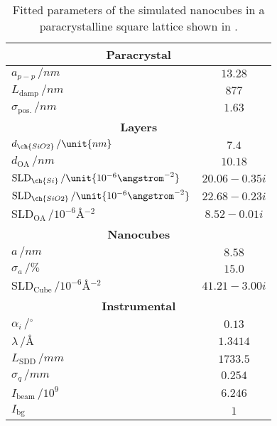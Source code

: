 \documentclass[\main/dresen_thesis.tex]{subfiles}
\begin{document}
  \begin{table}[!htbp]
    \centering
    \caption{\label{tab:monolayers:structure:squareArrayParacrystal:BornAgainSimulation}Fitted parameters of the simulated nanocubes in a paracrystalline square lattice shown in . }
    \begin{tabular}{l | c}
      \hline
      \multicolumn{2}{c}{\textbf{Paracrystal}}\\
      \hline
      $a_{p-p} \, / \unit{nm}$                                        & $13.28$ \\
      $L_\mathrm{damp} \, / \unit{nm}$                                & $877$ \\
      $\sigma_\mathrm{pos.}\, / \unit{nm}$                            & $1.63$ \\
      \hline
      \multicolumn{2}{c}{\textbf{Layers}}\\
      \hline
      $d_{\ch{SiO2}}\, / \unit{nm}$                                   & $7.4$\\
      $d_{\mathrm{OA}}\, / \unit{nm}$                                 & $10.18$\\
      $\mathrm{SLD}_{\ch{Si}} \, / \unit{10^{-6} \angstrom^{-2}}$     & $20.06 - 0.35 i$\\
      $\mathrm{SLD}_{\ch{SiO2}} \, / \unit{10^{-6} \angstrom^{-2}}$   & $22.68 - 0.23 i$\\
      $\mathrm{SLD}_\mathrm{OA} \, / \unit{10^{-6} \angstrom^{-2}}$   & $8.52 - 0.01 i$ \\
      \hline
      \multicolumn{2}{c}{\textbf{Nanocubes}}\\
      \hline
      $a \, / \unit{nm}$                                              & $8.58$ \\
      $\sigma_a \, / \unit{\%}$                                       & $15.0$ \\
      $\mathrm{SLD}_\mathrm{Cube} \, / \unit{10^{-6} \angstrom^{-2}}$ & $41.21 - 3.00 i$ \\
      \hline
      \multicolumn{2}{c}{\textbf{Instrumental}}\\
      \hline
      $\alpha_i \, / \unit{^\circ}$                                   & $0.13$ \\
      $\lambda \, / \unit{\angstrom}$                                 & $1.3414$ \\
      $L_\mathrm{SDD} \, / \unit{mm}$                                 & $1733.5$ \\
      $\sigma_q \, /\unit{mm}$                                        & $0.254$ \\
      $I_\mathrm{beam} \, / \unit{10^9}$                              & $6.246$ \\
      $I_\mathrm{bg}$                                                 & $1$ \\
      \hline
    \end{tabular}
  \end{table}
\end{document}
